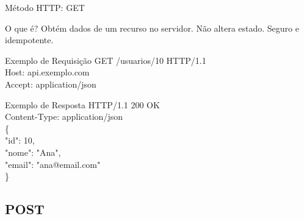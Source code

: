 \documentclass[9pt]{beamer}
\begin{document}
\begin{frame}{Método HTTP: GET}

\begin{block}{O que é?}
Obtém dados de um recurso no servidor.
Não altera estado. Seguro e idempotente.
\end{block}

\begin{block}{Exemplo de Requisição}
\ttfamily\footnotesize
GET /usuarios/10 HTTP/1.1 \\
Host: api.exemplo.com \\
Accept: application/json
\end{block}

\begin{block}{Exemplo de Resposta}
\ttfamily\footnotesize
HTTP/1.1 200 OK \\
Content-Type: application/json \\

\{ \\
\quad "id": 10, \\
\quad "nome": "Ana", \\
\quad "email": "ana@email.com" \\
\}
\end{block}

\begin{center}
\end{center}

\end{frame}

\subsection{POST}
\end{document}
